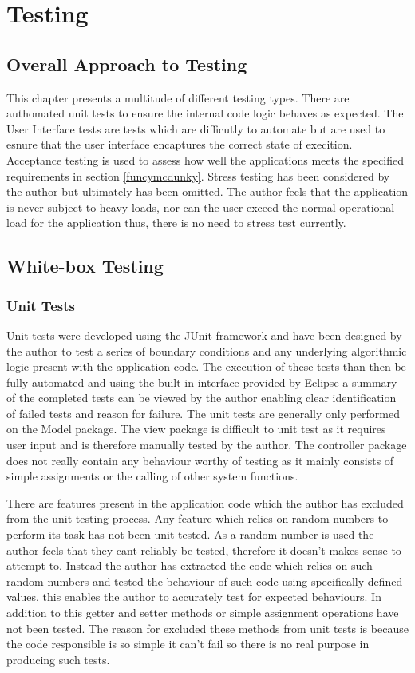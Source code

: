 \chapter{Testing}

\section{Overall Approach to Testing}

This chapter presents a multitude of different testing types. There are authomated unit tests to ensure the internal code logic behaves as expected. The User Interface tests are tests which are difficutly to automate but are used to esnure that the user interface encaptures the correct state of execition. Acceptance testing is used to assess how well the applications meets the specified requirements in section \ref{funcymcdunky}. Stress testing has been considered by the author but ultimately has been omitted. The author feels that the application is never subject to heavy loads, nor can the user exceed the normal operational load for the application thus, there is no need to stress test currently.
\section{White-box Testing}
\subsection{Unit Tests}

Unit tests were developed using the JUnit framework and have been designed by the author to test a series of boundary conditions and any underlying algorithmic logic present with the application code. The execution of these tests than then be fully automated and using the built in interface provided by Eclipse a summary of the completed tests can be viewed by the author enabling clear identification of failed tests and reason for failure. The unit tests are generally only performed on the Model package. The view package is difficult to unit test as it requires user input and is therefore manually tested by the author. The controller package does not really contain any behaviour worthy of testing as it mainly consists of simple assignments or the calling of other system functions.

There are features present in the application code which the author has excluded from the unit testing process. Any feature which relies on random numbers to perform its task has not been unit tested. As a random number is used the author feels that they cant reliably be tested, therefore it doesn’t makes sense to attempt to. Instead the author has extracted the code which relies on such random numbers and tested the behaviour of such code using specifically defined values, this enables the author to accurately test for expected behaviours. In addition to this getter and setter methods or simple assignment operations have not been tested. The reason for excluded these methods from unit tests is because the code responsible is so simple it can’t fail so there is no real purpose in producing such tests.

